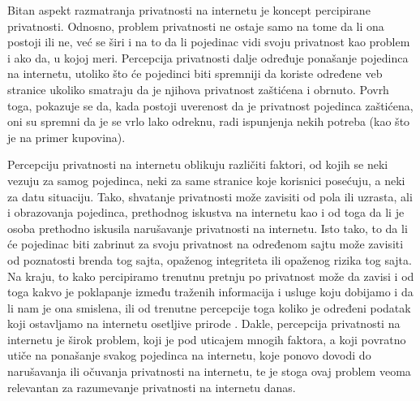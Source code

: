 \documentclass[a4paper]{article}
\begin{document}
Bitan aspekt razmatranja privatnosti na internetu je koncept percipirane privatnosti. Odnosno, problem privatnosti ne ostaje samo na tome da li ona postoji ili ne, već se širi i na to da li pojedinac vidi svoju privatnost kao problem i ako da, u kojoj meri. Percepcija privatnosti dalje određuje ponašanje pojedinca na internetu, utoliko što će pojedinci biti spremniji da koriste određene veb stranice ukoliko smatraju da je njihova privatnost zaštićena i obrnuto. Povrh toga, pokazuje se da, kada postoji uverenost da je privatnost pojedinca zaštićena, oni su spremni da je se vrlo lako odreknu, radi ispunjenja nekih potreba (kao što je na primer kupovina).
\par Percepciju privatnosti na internetu oblikuju različiti faktori, od kojih se neki vezuju za samog pojedinca, neki za same stranice koje korisnici posećuju, a neki za datu situaciju. Tako, shvatanje privatnosti može zavisiti od pola ili uzrasta, ali i obrazovanja pojedinca, prethodnog iskustva na internetu kao i od toga da li je osoba prethodno iskusila narušavanje privatnosti na internetu. Isto tako, to da li će pojedinac biti zabrinut za svoju privatnost na određenom sajtu može zavisiti od poznatosti brenda tog sajta, opaženog integriteta ili opaženog rizika tog sajta. Na kraju, to kako percipiramo trenutnu pretnju po privatnost može da zavisi i od toga kakvo je poklapanje između traženih informacija i usluge koju dobijamo i da li nam je ona smislena, ili od trenutne percepcije toga koliko je određeni podatak koji ostavljamo na internetu osetljive prirode \cite{renata}. Dakle, percepcija privatnosti na internetu je širok problem, koji je pod uticajem mnogih faktora, a koji povratno utiče na ponašanje svakog pojedinca na internetu, koje ponovo dovodi do narušavanja ili očuvanja privatnosti na internetu, te je stoga ovaj problem veoma relevantan za razumevanje privatnosti na internetu danas.
  
\end{document}
